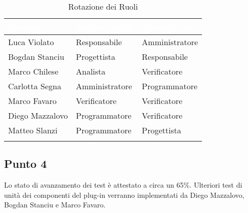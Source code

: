 \begin{center}
	\begin{longtable}[c]{|m{}|m{}|m{}|} 
		\hline
		\rowcolor{bluelogo}\textbf{\textcolor{white}{Membro}} & \textbf{\textcolor{white}{Vecchio Ruolo}} & \textbf{\textcolor{white}{Nuovo Ruolo}}\\
		\hline
		\hline
		Luca Violato & Responsabile & Amministratore \\
		\hline
		\rowcolor{grigio}Bogdan Stanciu & Progettista & Responsabile \\
		\hline
		Marco Chilese & Analista & Verificatore\\
		\hline
		\rowcolor{grigio}Carlotta Segna & Amministratore & Programmatore\\
		\hline
		Marco Favaro & Verificatore & Verificatore \\
		\hline
		\rowcolor{grigio} Diego Mazzalovo & Programmatore & Verificatore\\
		\hline
		Matteo Slanzi & Programmatore & Progettista\\
		\hline
		\caption{Rotazione dei Ruoli}
	\end{longtable}

\end{center}

\subsection{Punto 4}
Lo stato di avanzamento dei test è attestato a circa un 65\%. Ulteriori test di unità dei componenti del plug-in verranno implementati da Diego Mazzalovo, Bogdan Stanciu e Marco Favaro.
